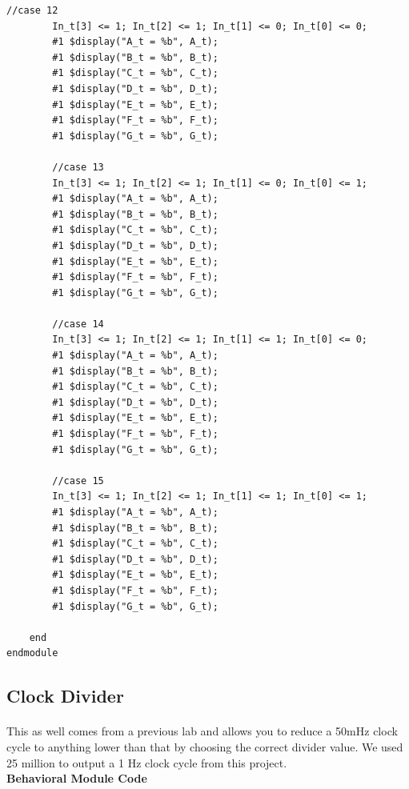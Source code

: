 \documentclass[12pt]{report}
\begin{document}
\begin{Verbatim}[frame=single, fontsize=\small]
		//case 12
		In_t[3] <= 1; In_t[2] <= 1; In_t[1] <= 0; In_t[0] <= 0;
		#1 $display("A_t = %b", A_t);
		#1 $display("B_t = %b", B_t);
		#1 $display("C_t = %b", C_t);
		#1 $display("D_t = %b", D_t);
		#1 $display("E_t = %b", E_t);
		#1 $display("F_t = %b", F_t);
		#1 $display("G_t = %b", G_t);
		
		//case 13
		In_t[3] <= 1; In_t[2] <= 1; In_t[1] <= 0; In_t[0] <= 1;
		#1 $display("A_t = %b", A_t);
		#1 $display("B_t = %b", B_t);
		#1 $display("C_t = %b", C_t);
		#1 $display("D_t = %b", D_t);
		#1 $display("E_t = %b", E_t);
		#1 $display("F_t = %b", F_t);
		#1 $display("G_t = %b", G_t);
		
		//case 14
		In_t[3] <= 1; In_t[2] <= 1; In_t[1] <= 1; In_t[0] <= 0;
		#1 $display("A_t = %b", A_t);
		#1 $display("B_t = %b", B_t);
		#1 $display("C_t = %b", C_t);
		#1 $display("D_t = %b", D_t);
		#1 $display("E_t = %b", E_t);
		#1 $display("F_t = %b", F_t);
		#1 $display("G_t = %b", G_t);
		
		//case 15
		In_t[3] <= 1; In_t[2] <= 1; In_t[1] <= 1; In_t[0] <= 1;
		#1 $display("A_t = %b", A_t);
		#1 $display("B_t = %b", B_t);
		#1 $display("C_t = %b", C_t);
		#1 $display("D_t = %b", D_t);
		#1 $display("E_t = %b", E_t);
		#1 $display("F_t = %b", F_t);
		#1 $display("G_t = %b", G_t);
	
	end
endmodule
			\end{Verbatim}

				\paragraph*{}
			

\subsection*{Clock Divider}
	\paragraph*{}
	This as well comes from a previous lab and allows you to reduce a 50mHz clock cycle to anything lower than that by choosing the correct divider value.  We used 25 million to output a 1 Hz clock cycle from this project.
	\vspace{0.3cm}\\
	\textbf{Behavioral Module Code}
\end{document}
